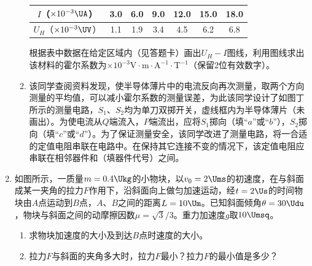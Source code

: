 \documentclass[\gkver]{gaokaozhenti}
\begin{document}
\begin{enumerate}
\begin{enumerate}
	\begin{center}
	\begin{tabular}{|c|c|c|c|c|c|c|}
	\hline
	$I$（$\times10^{-3}\UA$） & 3.0 & 6.0 & 9.0 & 12.0 & 15.0 & 18.0 \\
	\hline
	$U_{H}$（$\times10^{-3}\UV$） & 1.1 & 1.9 & 3.4 & 4.5 & 6.2 & 6.8 \\
	\hline
	\end{tabular}
	\end{center}

	根据表中数据在给定区域内（见答题卡）画出$U_{H}-I$图线，利用图线求出该材料的霍尔系数为$\times10^{-3}\mathrm{V}\cdot\mathrm{m}\cdot\mathrm{A}^{-1}\cdot\mathrm{T}^{-1}$（保留2位有效数字）。

	\item
	该同学查阅资料发现，使半导体薄片中的电流反向再次测量，取两个方向测量的平均值，可以减小霍尔系数的测量误差，为此该同学设计了如图丁所示的测量电路，$S_{1}$、$S_{2}$均为单刀双掷开关，虚线框内为半导体薄片（未画出）。为使电流从$Q$端流入，$P$端流出，应将$S_{1}$掷向（填“$a$”或“$b$”），$S_{2}$掷向（填“$c$”或“$d$”）。为了保证测量安全，该同学改进了测量电路，将一合适的定值电阻串联在电路中。在保持其它连接不变的情况下，该定值电阻应串联在相邻器件和（填器件代号）之间。

\end{enumerate}


\item
如图所示，一质量$m=0.4\Ukg$的小物块，以$v_{0}=2\Ums$的初速度，在与斜面成某一夹角的拉力$F$作用下，沿斜面向上做匀加速运动，经$t=2\Us$的时间物块由$A$点运动到$B$点，$A$、$B$之间的距离$L=10\Um$。已知斜面倾角$\theta=30\Udu$，物块与斜面之间的动摩擦因数$\mu=\sqrt 3/3$。重力加速度$g$取$10\Umsq$。
\begin{enumerate}
	\item
	求物块加速度的大小及到达$B$点时速度的大小。
	\item
	拉力$F$与斜面的夹角多大时，拉力$F$最小？拉力$F$的最小值是多少？
\end{enumerate}


\end{enumerate}
\end{document}
